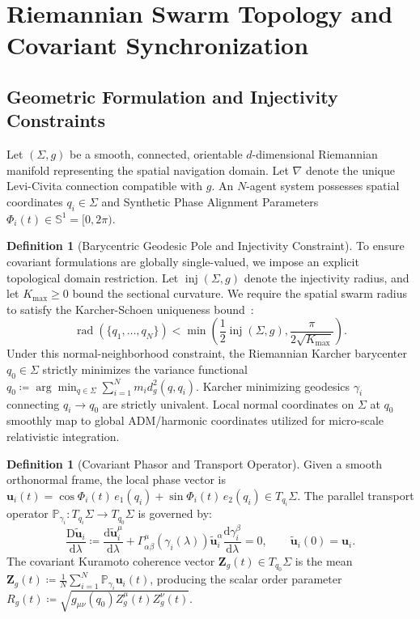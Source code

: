 \documentclass[11pt,a4paper,reqno]{article}
\theoremstyle{plain}
\theoremstyle{definition}
\newtheorem{definition}[theorem]{Definition}
\theoremstyle{remark}
\numberwithin{equation}{section}
\begin{document}
\bigskip

\section{Riemannian Swarm Topology and Covariant Synchronization}
\label{sec:riemannian_topology}

\subsection{Geometric Formulation and Injectivity Constraints}
Let $(\Sigma, g)$ be a smooth, connected, orientable $d$-dimensional Riemannian manifold representing the spatial navigation domain. Let $\nabla$ denote the unique Levi-Civita connection compatible with $g$. An $N$-agent system possesses spatial coordinates $q_i \in \Sigma$ and Synthetic Phase Alignment Parameters $\Phi_i(t) \in \mathbb{S}^1 = [0, 2\pi)$.

\begin{definition}[Barycentric Geodesic Pole and Injectivity Constraint]
\label{def:barycenter}
To ensure covariant formulations are globally single-valued, we impose an explicit topological domain restriction. Let $\operatorname{inj}(\Sigma, g)$ denote the injectivity radius, and let $K_{\max} \ge 0$ bound the sectional curvature. We require the spatial swarm radius to satisfy the Karcher-Schoen uniqueness bound~\cite{Karcher1977}:
\begin{equation}
\operatorname{rad}(\{q_1, \dots, q_N\}) < \min\left( \frac{1}{2} \operatorname{inj}(\Sigma, g), \frac{\pi}{2\sqrt{K_{\max}}} \right).
\end{equation}
Under this normal-neighborhood constraint, the Riemannian Karcher barycenter $q_0 \in \Sigma$ strictly minimizes the variance functional $q_0 \coloneqq \arg\min_{q \in \Sigma} \sum_{i=1}^N m_i d_g^2(q, q_i)$. Karcher minimizing geodesics $\gamma_i$ connecting $q_i \to q_0$ are strictly univalent. Local normal coordinates on $\Sigma$ at $q_0$ smoothly map to global ADM/harmonic coordinates utilized for micro-scale relativistic integration.
\end{definition}

\begin{definition}[Covariant Phasor and Transport Operator]
Given a smooth orthonormal frame, the local phase vector is $\bm{u}_i(t) = \cos \Phi_i(t) \, e_1(q_i) + \sin \Phi_i(t) \, e_2(q_i) \in T_{q_i}\Sigma$. The parallel transport operator $\mathbb{P}_{\gamma_i}: T_{q_i}\Sigma \to T_{q_0}\Sigma$ is governed by:
\begin{equation}
\frac{\mathrm{D} \widetilde{\bm{u}}_i}{\mathrm{d}\lambda} \coloneqq \frac{\mathrm{d} \widetilde{\bm{u}}_i^\mu}{\mathrm{d}\lambda} + \Gamma^\mu_{\alpha\beta}(\gamma_i(\lambda)) \widetilde{\bm{u}}_i^\alpha \frac{\mathrm{d}\gamma_i^\beta}{\mathrm{d}\lambda} = 0, \qquad \widetilde{\bm{u}}_i(0) = \bm{u}_i.
\end{equation}
The covariant Kuramoto coherence vector $\bm{Z}_g(t) \in T_{q_0}\Sigma$ is the mean $\bm{Z}_g(t) \coloneqq \frac{1}{N} \sum_{i=1}^N \mathbb{P}_{\gamma_i} \bm{u}_i(t)$, producing the scalar order parameter $R_g(t) \coloneqq \sqrt{g_{\mu\nu}(q_0) Z_g^\mu(t) Z_g^\nu(t)}$.
\end{definition}
\end{document}
